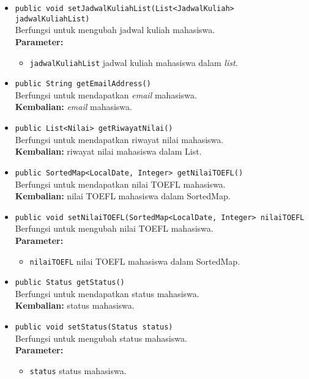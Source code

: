 \begin{itemize}
	\item \texttt{public void setJadwalKuliahList(List<JadwalKuliah> jadwalKuliahList)}\\
		Berfungsi untuk mengubah jadwal kuliah mahasiswa.\\
        \textbf{Parameter:}
		\begin{itemize}
			\item \texttt{jadwalKuliahList} jadwal kuliah mahasiswa dalam \textit{list}.
		\end{itemize}	
		
	\item \texttt{public String getEmailAddress()}\\
		Berfungsi untuk mendapatkan \textit{email} mahasiswa.\\
		\textbf{Kembalian:} \textit{email} mahasiswa.
	
	\item \texttt{public List<Nilai> getRiwayatNilai()}\\
		Berfungsi untuk mendapatkan riwayat nilai mahasiswa.\\
		\textbf{Kembalian:} riwayat nilai mahasiswa dalam List.
		
	\item \texttt{public SortedMap<LocalDate, Integer> getNilaiTOEFL()}\\
	Berfungsi untuk mendapatkan nilai TOEFL mahasiswa.\\
	\textbf{Kembalian:} nilai TOEFL mahasiswa dalam SortedMap.
	
	\item \texttt{public void setNilaiTOEFL(SortedMap<LocalDate, Integer> nilaiTOEFL}\\
	Berfungsi untuk mengubah nilai TOEFL mahasiswa.\\
    \textbf{Parameter:}
		\begin{itemize}
			\item \texttt{nilaiTOEFL} nilai TOEFL mahasiswa dalam SortedMap.
		\end{itemize}		
		
	\item \texttt{public Status getStatus()}\\
	Berfungsi untuk mendapatkan status mahasiswa.\\
	\textbf{Kembalian:} status mahasiswa.
	
	\item \texttt{public void setStatus(Status status)}\\
	Berfungsi untuk mengubah status mahasiswa.\\
        \textbf{Parameter:}
		\begin{itemize}
			\item \texttt{status} status mahasiswa.
		\end{itemize}	
		

\end{itemize}
